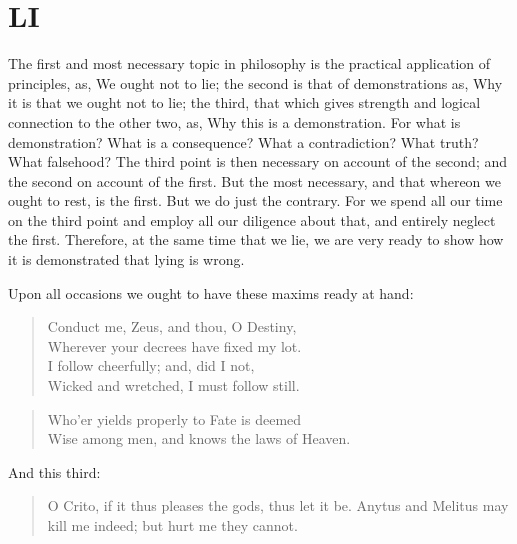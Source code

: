 \documentclass[11pt]{article}
\begin{document}
\section*{LI}

The first and most necessary topic in philosophy is the practical application of principles, as, We ought not to lie; the second is that of demonstrations as, Why it is that we ought not to lie; the third, that which gives strength and logical connection to the other two, as, Why this is a demonstration. For what is demonstration? What is a consequence? What a contradiction? What truth? What falsehood? The third point is then necessary on account of the second; and the second on account of the first. But the most necessary, and that whereon we ought to rest, is the first. But we do just the contrary. For we spend all our time on the third point and employ all our diligence about that, and entirely neglect the first. Therefore, at the same time that we lie, we are very ready to show how it is demonstrated that lying is wrong.

Upon all occasions we ought to have these maxims ready at hand:

\begin{quote}
Conduct me, Zeus, and thou, O Destiny, \\
Wherever your decrees have fixed my lot. \\
I follow cheerfully; and, did I not, \\
Wicked and wretched, I must follow still.
\end{quote}

\begin{quote}
Who'er yields properly to Fate is deemed \\
Wise among men, and knows the laws of Heaven.
\end{quote}

And this third:

\begin{quote}
O Crito, if it thus pleases the gods, thus let it be. Anytus and Melitus may kill me indeed; but hurt me they cannot.
\end{quote}
\end{document}
